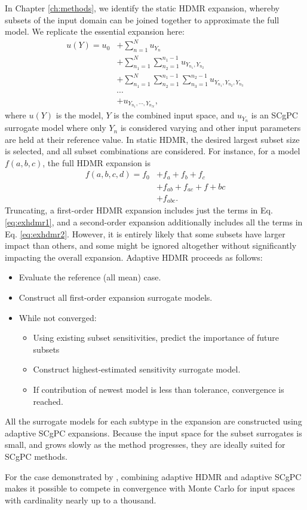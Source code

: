 In Chapter \ref{ch:methods}, we identify the static HDMR expansion, whereby subsets of the input domain can be
joined together to approximate the full model.  We replicate the essential expansion here:
\begin{align}
  u(Y) = u_0 &+ \sum_{n=1}^N u_{Y_n} \nonumber\\
  &+ \sum_{n_1=1}^N \sum_{n_2=1}^{n_1-1} u_{Y_{n_1},Y_{n_2}} \nonumber \\
  &+ \sum_{n_1=1}^N \sum_{n_2=1}^{n_1-1} \sum_{n_3=1}^{n_2-1} u_{Y_{n_1},Y_{n_2},Y_{n_3}} \nonumber \\
  &\cdots \nonumber\\
  &+u_{Y_{n_1},\cdots,Y_{n_N}},
\end{align}
where $u(Y)$ is the model, $Y$ is the combined input space, and $u_{Y_n}$ is an SCgPC surrogate model where
only $Y_n$ is considered varying and other input parameters are held at their reference value.  In static
HDMR, the desired largest subset size is selected, and all subset combinations are considered.  For instance,
for a model $f(a,b,c)$, the full HDMR expansion is
\begin{align}
  f(a,b,c,d) = f_0 &+ f_a + f_b + f_c \label{eq:exhdmr1}\\
    &+ f_{ab} + f_{ac} + f+{bc} \label{eq:exhdmr2}\\
    &+ f_{abc}. \label{eq:exhdmr3}
\end{align}
Truncating, a first-order HDMR expansion includes just the terms in Eq. \ref{eq:exhdmr1}, and a second-order
expansion additionally includes all the terms in Eq. \ref{eq:exhdmr2}.  However, it is entirely likely that
some subsets have larger impact than others, and some might be ignored altogether without significantly
impacting the overall expansion.  Adaptive HDMR proceeds as follows:
\begin{itemize}
  \item Evaluate the reference (all mean) case.
  \item Construct all first-order expansion surrogate models.
  \item While not converged:
  \begin{itemize}
    \item Using existing subset sensitivities, predict the importance of future subsets
    \item Construct highest-estimated sensitivity surrogate model.
    \item If contribution of newest model is less than tolerance, convergence is reached.
  \end{itemize}
\end{itemize}
All the surrogate models for each subtype in the expansion are constructed using adaptive SCgPC expansions.
Because the input space for the subset surrogates is small, and grows slowly as the method progresses, they
are ideally suited for SCgPC methods.

For the case demonstrated by \cite{Ayres}, combining adaptive HDMR and adaptive SCgPC makes it possible to
compete in convergence with Monte Carlo for input spaces with cardinality nearly up to a thousand.
